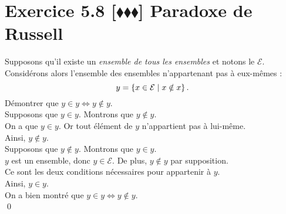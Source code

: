 \documentclass[10pt]{article}
\begin{document}
\section*{Exercice 5.8 [$\blacklozenge\blacklozenge\blacklozenge$] Paradoxe de Russell}
\begin{tcolorbox}[enhanced, width=7in, center, size=fbox, fontupper=\large, drop shadow southwest]
    Supposons qu'il existe un \emph{ensemble de tous les ensembles} et notons le $\mathcal{E}$.\\
    Considérons alors l'ensemble des ensembles n'appartenant pas à eux-mêmes :
    \begin{equation*}
        y=\left\lbrace x \in \mathcal{E} \hspace{0.1cm} | \hspace{0.1cm} x \notin x \right\rbrace.
    \end{equation*}
    Démontrer que $y \in y \iff y \notin y$.\\[0.25cm]
    Supposons que $y \in y$. Montrons que $y \notin y$.\\
    On a que $y \in y$.
    Or tout élément de $y$ n'appartient pas à lui-même.\\
    Ainsi, $y \notin y$.\\[0.25cm]
    Supposons que $y \notin y$. Montrons que $y \in y$.\\
    $y$ est un ensemble, donc $y \in \mathcal{E}$. De plus, $y \notin y$ par supposition.\\
    Ce sont les deux conditions nécessaires pour appartenir à $y$.\\
    Ainsi, $y \in y$.\\[0.25cm]
    On a bien montré que $y \in y \iff y \notin y$.\\
    \qed

\end{tcolorbox}

\end{document}
